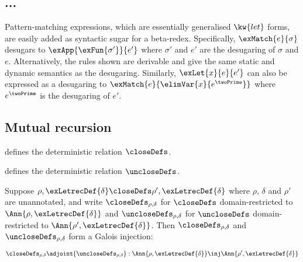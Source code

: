 


% 






% 
% 
% 
% 

% 

\subsection{...}
\label{sec:impl-language:match-as}

Pattern-matching expressions, which are essentially generalised $\kw{let}$
forms, are easily added as syntactic sugar for a beta-redex. Specifically,
$\exMatch{e}{\sigma}$ desugars to $\exApp{\exFun{\sigma'}}{e'}$ where $\sigma'$
and $e'$ are the desugaring of $\sigma$ and $e$. Alternatively, the rules shown
are derivable and give the same static and dynamic semantics as the desugaring.
Similarly, $\exLet{x}{e}{e'}$ can also be expressed as a desugaring to
$\exMatch{e}{\elimVar{x}{e^\twoPrime}}$ where $e^\twoPrime$ is the desugaring of
$e'$.

\subsection{Mutual recursion}
\label{sec:impl-language:recursion}



\begin{definition}
\label{def:closedefs}
    defines the deterministic relation $\closeDefs$.
\end{definition}

\begin{definition}
\label{def:unclosedefs}
    defines the deterministic relation $\uncloseDefs$.
\end{definition}

\begin{lemma}
\label{lem:gc-closedefs}

Suppose $\rho, \exLetrecDef{\delta} \closeDefs \rho', \exLetrecDef{\delta}$
where $\rho$, $\delta$ and $\rho'$ are unannotated, and write $\closeDefs_{\rho,
\delta}$ for $\closeDefs$ domain-restricted to $\Ann{\rho,
\exLetrecDef{\delta}}$ and $\uncloseDefs_{\rho, \delta}$ for $\uncloseDefs$
domain-restricted to $\Ann{\rho',\exLetrecDef{\delta}}$. Then $\closeDefs_{\rho,
\delta}$ and $\uncloseDefs_{\rho, \delta}$ form a Galois injection:

\[
   {\closeDefs_{\rho, \delta}} \adjoint {\uncloseDefs_{\rho, \delta}}:
   \Ann{\rho, \exLetrecDef{\delta}} \inj \Ann{\rho',\exLetrecDef{\delta}}
\]

\end{lemma}
